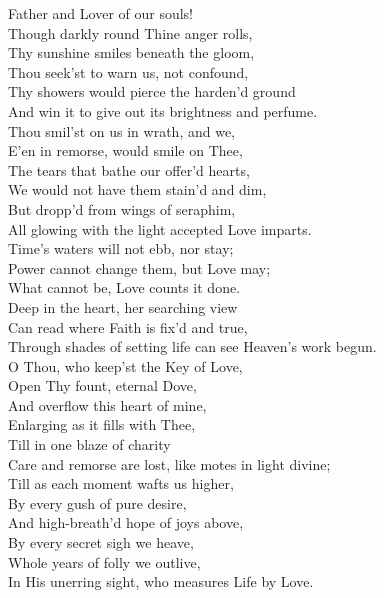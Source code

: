   Father and Lover of our souls! \\
 Though darkly round Thine anger rolls, \\
 Thy sunshine smiles beneath the gloom, \\
 Thou seek’st to warn us, not confound, \\
 Thy showers would pierce the harden’d ground \\
 And win it to give out its brightness and perfume. \\
  Thou smil’st on us in wrath, and we, \\
 E’en in remorse, would smile on Thee, \\
 The tears that bathe our offer’d hearts, \\
 We would not have them stain’d and dim, \\
 But dropp’d from wings of seraphim, \\
 All glowing with the light accepted Love imparts. \\
  Time’s waters will not ebb, nor stay; \\
 Power cannot change them, but Love may; \\
 What cannot be, Love counts it done. \\
 Deep in the heart, her searching view \\
 Can read where Faith is fix’d and true, \\
 Through shades of setting life can see Heaven’s work begun. \\
  O Thou, who keep’st the Key of Love, \\
 Open Thy fount, eternal Dove, \\
 And overflow this heart of mine, \\
 Enlarging as it fills with Thee, \\
 Till in one blaze of charity \\
 Care and remorse are lost, like motes in light divine; \\
  Till as each moment wafts us higher, \\
 By every gush of pure desire, \\
 And high-breath’d hope of joys above, \\
 By every secret sigh we heave, \\
 Whole years of folly we outlive, \\
 In His unerring sight, who measures Life by Love.\\


